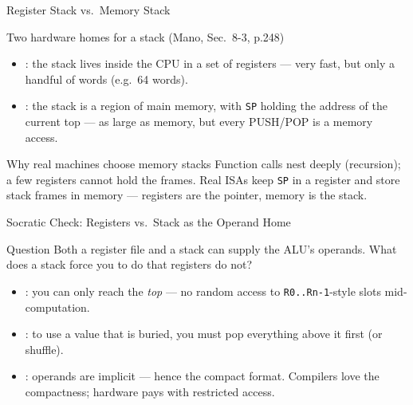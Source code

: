 \documentclass[aspectratio=169]{beamer}
\begin{document}
\begin{frame}{Register Stack vs.\ Memory Stack}
  \begin{block}{Two hardware homes for a stack (Mano, Sec.~8-3, p.248)}
    \begin{itemize}
      \item {}: the stack lives inside the CPU in a set of
        registers --- very fast, but only a handful of words (e.g.~64 words).
      \item {}: the stack is a region of main memory, with
        \texttt{SP} holding the address of the current top --- as large as
        memory, but every PUSH/POP is a memory access.
    \end{itemize}
  \end{block}
  \begin{exampleblock}{Why real machines choose memory stacks}
    Function calls nest deeply (recursion); a few registers cannot hold the
    frames. Real ISAs keep \texttt{SP} in a register and store stack frames in
    memory --- registers are the pointer, memory is the stack.
  \end{exampleblock}
\end{frame}

\begin{frame}{Socratic Check: Registers vs.\ Stack as the Operand Home}
  \begin{alertblock}{Question}
    Both a register file and a stack can supply the ALU's operands. What does a
    stack force you to do that registers do not?
  \end{alertblock}
  \begin{itemize}
    \item {}: you can only reach the \emph{top} --- no
      random access to \texttt{R0..Rn-1}-style slots mid-computation.
    \item {}: to use a value that is buried, you must pop
      everything above it first (or shuffle).
    \item {}: operands are implicit --- hence the
      compact  format. Compilers love the compactness; hardware
      pays with restricted access.
  \end{itemize}
\end{frame}

\end{document}
